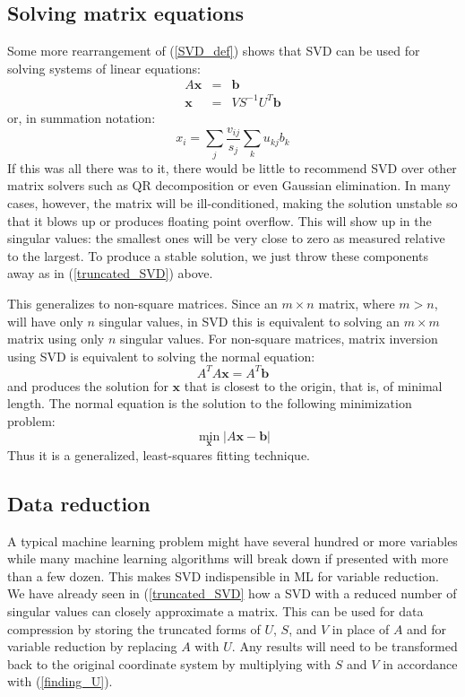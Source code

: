 \documentclass{article}
\renewcommand{\vec}[1]{\boldsymbol{#1}}
\begin{document}
\subsection{Solving matrix equations}

Some more rearrangement of (\ref{SVD_def}) shows that SVD can be used 
for solving systems of linear equations:
\begin{eqnarray}
A \vec x & = & \vec b \\
\vec x & = & V S^{-1} U^T \vec b
\label{matrix_solution}
\end{eqnarray}
or, in summation notation:
\begin{equation}
	x_i = \sum_j \frac{v_{ij}}{s_j} \sum_k u_{kj} b_k
\end{equation}
If this was all there was to it, there would be little to recommend SVD over
other matrix solvers such as QR decomposition or even Gaussian elimination.
In many cases, however, the matrix will be ill-conditioned, making the
solution unstable so that it blows up or produces floating point overflow. 
This will show up in the singular values: the smallest ones will be very close
to zero as measured relative to the largest.
To produce a stable solution, we just throw these components away as in
(\ref{truncated_SVD}) above.

This generalizes to non-square matrices. Since an $m \times n$ matrix, where
$m > n$, will have only $n$ singular values, in SVD this is equivalent to 
solving an $m \times m$ matrix using only $n$ singular values.
For non-square matrices, matrix inversion using SVD is equivalent to solving
the normal equation:
\begin{equation}
A^T A \vec x = A^T \vec b
\label{normal_equation}
\end{equation}
and produces the solution for $\vec x$ that is closest to the origin,
that is, of minimal length.
The normal equation is the solution to the following minimization problem:
\begin{equation}
\min_{\vec x} | A \vec x - \vec b|
\label{least_squares}
\end{equation}
Thus it is a generalized, least-squares fitting technique.

\subsection{Data reduction}

A typical machine learning problem might have several hundred or more
variables while many machine learning algorithms will break down if presented
with more than a few dozen.
This makes SVD indispensible in ML for variable reduction.
We have already seen in (\ref{truncated_SVD} how a SVD with a reduced number
of singular values can closely approximate a matrix.
This can be used for data compression by storing the truncated forms of
$U$, $S$, and $V$ in place of $A$ and for variable reduction by replacing
$A$ with $U$.
Any results will need to be transformed back to the original coordinate system
by multiplying with $S$ and $V$ in accordance with (\ref{finding_U}).
\end{document}
